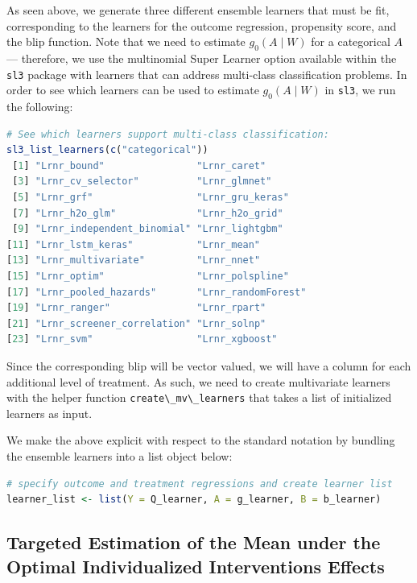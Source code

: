 \documentclass[
  12pt, krantz2,
]{krantz}
\newcommand{\passthrough}[1]{#1}
\newcommand{\1}{\mathbbm{1}}
\theoremstyle{definition}
\theoremstyle{definition}
\theoremstyle{definition}
\theoremstyle{definition}
\theoremstyle{remark}
\begin{document}
As seen above, we generate three different ensemble learners that must be fit,
corresponding to the learners for the outcome regression, propensity score, and
the blip function. Note that we need to estimate \(g_0(A \mid W)\) for a
categorical \(A\) --- therefore, we use the multinomial Super Learner option
available within the \passthrough{\lstinline!sl3!} package with learners that can address multi-class
classification problems. In order to see which learners can be used to estimate
\(g_0(A \mid W)\) in \passthrough{\lstinline!sl3!}, we run the following:

\begin{lstlisting}[language=R]
# See which learners support multi-class classification:
sl3_list_learners(c("categorical"))
 [1] "Lrnr_bound"                "Lrnr_caret"               
 [3] "Lrnr_cv_selector"          "Lrnr_glmnet"              
 [5] "Lrnr_grf"                  "Lrnr_gru_keras"           
 [7] "Lrnr_h2o_glm"              "Lrnr_h2o_grid"            
 [9] "Lrnr_independent_binomial" "Lrnr_lightgbm"            
[11] "Lrnr_lstm_keras"           "Lrnr_mean"                
[13] "Lrnr_multivariate"         "Lrnr_nnet"                
[15] "Lrnr_optim"                "Lrnr_polspline"           
[17] "Lrnr_pooled_hazards"       "Lrnr_randomForest"        
[19] "Lrnr_ranger"               "Lrnr_rpart"               
[21] "Lrnr_screener_correlation" "Lrnr_solnp"               
[23] "Lrnr_svm"                  "Lrnr_xgboost"             
\end{lstlisting}

Since the corresponding blip will be vector valued, we will have a
column for each additional level of treatment. As such, we need to create
multivariate learners with the helper function \passthrough{\lstinline!create\_mv\_learners!} that takes a
list of initialized learners as input.

We make the above explicit with respect to the standard notation by bundling the
ensemble learners into a list object below:

\begin{lstlisting}[language=R]
# specify outcome and treatment regressions and create learner list
learner_list <- list(Y = Q_learner, A = g_learner, B = b_learner)
\end{lstlisting}

\hypertarget{oit-eval-cat-v1}{%
\subsection{Targeted Estimation of the Mean under the Optimal Individualized Interventions Effects}\label{oit-eval-cat-v1}}
\end{document}
